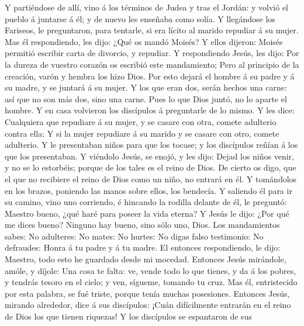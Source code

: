  Y partiéndose de allí, vino á los términos de Judea y
tras el Jordán: y volvió el pueblo á juntarse á él; y de nuevo les
enseñaba como solía.  Y llegándose los Fariseos, le
preguntaron, para tentarle, si era lícito al marido repudiar á su mujer.
 Mas él respondiendo, les dijo: ¿Qué os mandó Moisés?
 Y ellos dijeron: Moisés permitió escribir carta de
divorcio, y repudiar.  Y respondiendo Jesús, les dijo: Por
la dureza de vuestro corazón os escribió este mandamiento;
 Pero al principio de la creación, varón y hembra los hizo
Dios.  Por esto dejará el hombre á su padre y á su madre,
y se juntará á su mujer.  Y los que eran dos, serán hechos
una carne: así que no son más dos, sino una carne.  Pues
lo que Dios juntó, no lo aparte el hombre.  Y en casa
volvieron los discípulos á preguntarle de lo mismo.  Y
les dice: Cualquiera que repudiare á su mujer, y se casare con otra,
comete adulterio contra ella:  Y si la mujer repudiare á
su marido y se casare con otro, comete adulterio.  Y le
presentaban niños para que los tocase; y los discípulos reñían á los que
los presentaban.  Y viéndolo Jesús, se enojó, y les dijo:
Dejad los niños venir, y no se lo estorbéis; porque de los tales es el
reino de Dios.  De cierto os digo, que el que no
recibiere el reino de Dios como un niño, no entrará en él.
 Y tomándolos en los brazos, poniendo las manos sobre
ellos, los bendecía.  Y saliendo él para ir su camino,
vino uno corriendo, é hincando la rodilla delante de él, le preguntó:
Maestro bueno, ¿qué haré para poseer la vida eterna?  Y
Jesús le dijo: ¿Por qué me dices bueno? Ninguno hay bueno, sino sólo
uno, Dios.  Los mandamientos sabes: No adulteres: No
mates: No hurtes: No digas falso testimonio: No defraudes: Honra á tu
padre y á tu madre.  El entonces respondiendo, le dijo:
Maestro, todo esto he guardado desde mi mocedad. 
Entonces Jesús mirándole, amóle, y díjole: Una cosa te falta: ve, vende
todo lo que tienes, y da á los pobres, y tendrás tesoro en el cielo; y
ven, sígueme, tomando tu cruz.  Mas él, entristecido por
esta palabra, se fué triste, porque tenía muchas posesiones.
 Entonces Jesús, mirando alrededor, dice á sus
discípulos: ¡Cuán difícilmente entrarán en el reino de Dios los que
tienen riquezas!  Y los discípulos se espantaron de sus

